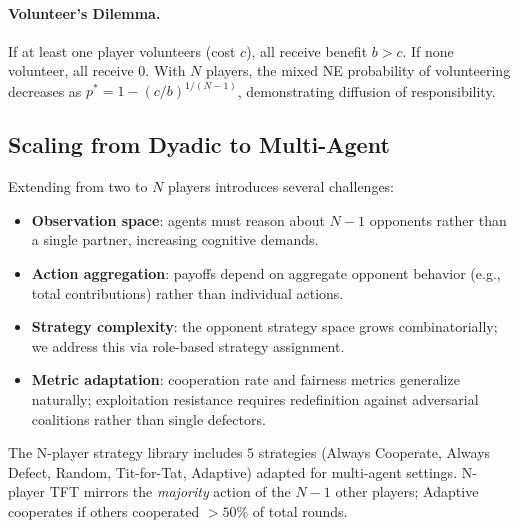 \paragraph{Volunteer's Dilemma.} If at least one player volunteers (cost $c$),
all receive benefit $b > c$. If none volunteer, all receive $0$.
With $N$ players, the mixed NE probability of volunteering decreases as
$p^* = 1 - (c/b)^{1/(N-1)}$, demonstrating diffusion of responsibility.

\subsection{Scaling from Dyadic to Multi-Agent}
\label{sec:scaling}

Extending from two to $N$ players introduces several challenges:

\begin{itemize}[nosep]
    \item \textbf{Observation space}: agents must reason about $N-1$ opponents
          rather than a single partner, increasing cognitive demands.
    \item \textbf{Action aggregation}: payoffs depend on aggregate opponent
          behavior (e.g., total contributions) rather than individual actions.
    \item \textbf{Strategy complexity}: the opponent strategy space grows
          combinatorially; we address this via role-based strategy assignment.
    \item \textbf{Metric adaptation}: cooperation rate and fairness metrics
          generalize naturally; exploitation resistance requires redefinition
          against adversarial coalitions rather than single defectors.
\end{itemize}

The N-player strategy library includes $5$ strategies (Always Cooperate,
Always Defect, Random, Tit-for-Tat, Adaptive) adapted for multi-agent
settings. N-player TFT mirrors the \emph{majority} action of the $N-1$
other players; Adaptive cooperates if others cooperated $>50\%$ of total
rounds.
